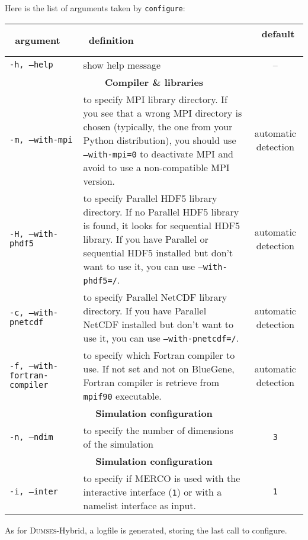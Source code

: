 \documentclass[a4paper,12pt]{article}
\begin{document}
Here is the list of arguments taken by \texttt{configure}:
\clearpage
\begin{table}[h!]
  \centering
  {\footnotesize
    \begin{tabular}{l | p{} | c }
      ~\hfill argument\hfill~ & ~\hfill definition\hfill~ & ~\hfill default \hfill~ \\
      \hline
      \hline
      \texttt{-h, --help} & show help message & -- \\
      \hline
      \multicolumn{3}{c}{\normalsize \bfseries Compiler \& libraries} \\
      \hline
      \texttt{-m, --with-mpi} & to specify MPI library directory. If you see that a wrong MPI directory is chosen (typically, the one from your Python distribution), you should use \texttt{--with-mpi=0} to deactivate MPI and avoid to use a non-compatible MPI version. & automatic detection \\
      \texttt{-H, --with-phdf5} & to specify Parallel HDF5 library directory. If no Parallel HDF5 library is found, it looks for sequential HDF5 library. If you have Parallel or sequential HDF5 installed but don't want to use it, you can use \texttt{--with-phdf5=/}. & automatic detection \\
      \texttt{-c, --with-pnetcdf} & to specify Parallel NetCDF library directory. If you have Parallel NetCDF installed but don't want to use it, you can use \texttt{--with-pnetcdf=/}. & automatic detection \\
      \texttt{-f, --with-fortran-compiler} & to specify which Fortran compiler to use. If not set and not on BlueGene, Fortran compiler is retrieve from \texttt{mpif90} executable. & automatic detection \\
      \hline
      \multicolumn{3}{c}{\normalsize \bfseries Simulation configuration} \\
      \hline
      \texttt{-n, --ndim} & to specify the number of dimensions of the simulation & \texttt{3} \\
      \hline
      \multicolumn{3}{c}{\normalsize \bfseries Simulation configuration} \\
      \hline
      \texttt{-i, --inter} & to specify if MERCO is used with the interactive interface (\texttt{1}) or with a namelist interface as input. & \texttt{1} \\
      \hline
    \end{tabular}
  }
\end{table}

As for \textsc{Dumses}-Hybrid, a logfile is generated, storing the last call to configure.
\end{document}
